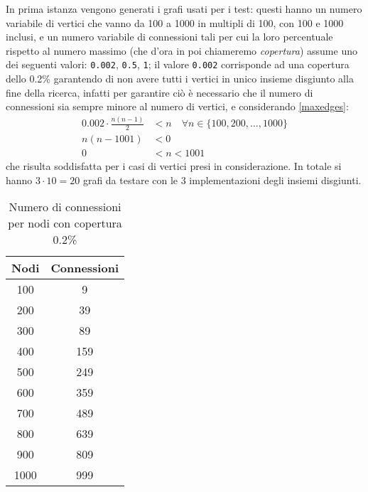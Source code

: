 In prima istanza vengono generati i grafi usati per i test: questi hanno un numero variabile di vertici che vanno da 100 a 1000 in multipli di 100, con 100
e 1000 inclusi, e un numero variabile di connessioni tali per cui la loro percentuale rispetto al numero massimo (che d'ora in poi chiameremo
\textit{copertura}) assume uno dei seguenti valori: \texttt{0.002}, \texttt{0.5}, \texttt{1}; il valore \texttt{0.002} corrisponde ad una copertura
dello 0.2\% garantendo di non avere tutti i vertici in unico insieme disgiunto alla fine della ricerca, infatti per garantire ciò è necessario che il numero
di connessioni sia sempre minore al numero di vertici, e considerando \eqref{maxedges}:
\begin{equation}
      \begin{aligned}
            0.002 \cdot \frac{n(n-1)}{2} & < n \quad \forall n \in \{100, 200, \ldots, 1000\} \\
            n(n-1001)                    & < 0                                                \\
            0                            & < n < 1001
      \end{aligned}
\end{equation}
che risulta soddisfatta per i casi di vertici presi in considerazione. In totale si hanno $3 \cdot 10 = 20$ grafi da testare con le 3 implementazioni
degli insiemi disgiunti.

\begin{table}[!h]
      \begin{tabular}{|c|c|}
            \hline
            Nodi & Connessioni \\ \hline
            100  & 9           \\ \hline
            200  & 39          \\ \hline
            300  & 89          \\ \hline
            400  & 159         \\ \hline
            500  & 249         \\ \hline
            600  & 359         \\ \hline
            700  & 489         \\ \hline
            800  & 639         \\ \hline
            900  & 809         \\ \hline
            1000 & 999         \\ \hline
      \end{tabular}
      \caption{Numero di connessioni per nodi con copertura 0.2\%}
\end{table}

